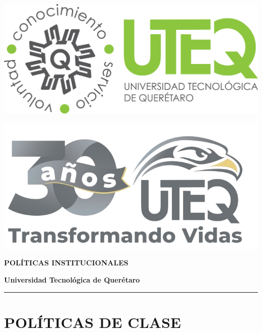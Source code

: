\documentclass[11pt, letterpaper]{article}
\begin{document}
	
	\begin{center}
		\begin{minipage}{0.4\textwidth}
			\includegraphics[width=0.5\linewidth]{Imagenes/Logo_uteq}
		\end{minipage}
		
		\begin{minipage}{0.4\textwidth}
			\includegraphics[width=0.5\linewidth]{Imagenes/Logo_uteq_30}
		\end{minipage}
		
		\vspace{1cm}
		{\color{uteqGreen}\Huge\bfseries POLÍTICAS INSTITUCIONALES}
		
		\vspace{0.3cm}
		{\large\bfseries Universidad Tecnológica de Querétaro}
		
		\vspace{0.5cm}
		\rule{\textwidth}{3pt}
	\end{center}
	
	\vspace{1cm}
	
	\section*{\color{uteqGreen}POLÍTICAS DE CLASE}
	
\end{document}
